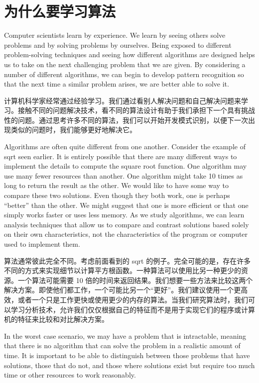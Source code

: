 \section{为什么要学习算法}
Computer scientists learn by experience. We learn by seeing others solve problems and by solving problems by ourselves. Being exposed to different problem-solving techniques and seeing how different algorithms are designed helps us to take on the next challenging problem that we are given. By considering a number of different algorithms, we can begin to develop pattern recognition so that the next time a similar problem arises, we are better able to solve it.

计算机科学家经常通过经验学习。我们通过看别人解决问题和自己解决问题来学习。接触不同的问题解决技术，看不同的算法设计有助于我们承担下一个具有挑战性的问题。通过思考许多不同的算法，我们可以开始开发模式识别，以便下一次出现类似的问题时，我们能够更好地解决它。

Algorithms are often quite different from one another. Consider the example of sqrt seen earlier. It is entirely possible that there are many different ways to implement the details to compute the square root function. One algorithm may use many fewer resources than another. One algorithm might take 10 times as long to return the result as the other. We would like to have some way to compare these two solutions. Even though they both work, one is perhaps “better” than the other. We might suggest that one is more efficient or that one simply works faster or uses less memory. As we study algorithms, we can learn analysis techniques that allow us to compare and contrast solutions based solely on their own characteristics, not the characteristics of the program or computer used to implement them.

算法通常彼此完全不同。考虑前面看到的 sqrt 的例子。完全可能的是，存在许多不同的方式来实现细节以计算平方根函数。一种算法可以使用比另一种更少的资源。一个算法可能需要 10 倍的时间来返回结果。我们想要一些方法来比较这两个解决方案。即使他们都工作，一个可能比另一个“更好”。我们建议使用一个更高效，或者一个只是工作更快或使用更少的内存的算法。当我们研究算法时，我们可以学习分析技术，允许我们仅仅根据自己的特征而不是用于实现它们的程序或计算机的特征来比较和对比解决方案。

In the worst case scenario, we may have a problem that is intractable, meaning that there is no algorithm that can solve the problem in a realistic amount of time. It is important to be able to distinguish between those problems that have solutions, those that do not, and those where solutions exist but require too much time or other resources to work reasonably.

